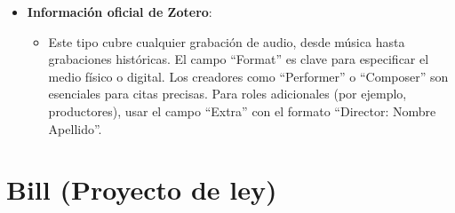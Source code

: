 \documentclass[
  jou,
  floatsintext,
  longtable,
  a4paper,
  nolmodern,
  notxfonts,
  notimes,
  12pt,
  colorlinks=true,linkcolor=blue,citecolor=blue,urlcolor=blue]{apa7}
\providecommand{\tightlist}{%
  \setlength{\itemsep}{0pt}\setlength{\parskip}{0pt}}
\begin{document}
\begin{itemize}
\begin{itemize}
    \textbf{Publisher}: Editorial o productora de la grabación.
  \item
    \textbf{ISBN}: Número ISBN, si la grabación está publicada como
    parte de un conjunto.
  \item
    \textbf{Language}: Código ISO del idioma.
  \item
    \textbf{Short Title}: Título abreviado para citas posteriores.
  \item
    \textbf{URL}: Dirección web de la grabación.
  \item
    \textbf{Accessed}: Fecha de acceso en línea.
  \item
    \textbf{Archive/Loc. in Archive}: Archivo y ubicación específica
    donde se encuentra.
  \item
    \textbf{Library Catalog/Call Number}: Catálogo y número de
    clasificación.
  \item
    \textbf{Rights/Extra/Date Added/Modified}: Igual que en ``Artwork''.
  \end{itemize}
\item
  \textbf{Información oficial de Zotero}:

  \begin{itemize}
  \tightlist
  \item
    Este tipo cubre cualquier grabación de audio, desde música hasta
    grabaciones históricas. El campo ``Format'' es clave para
    especificar el medio físico o digital. Los creadores como
    ``Performer'' o ``Composer'' son esenciales para citas precisas.
    Para roles adicionales (por ejemplo, productores), usar el campo
    ``Extra'' con el formato ``Director: Nombre \textbar\textbar{}
    Apellido''.
  \end{itemize}
\end{itemize}

\section{Bill (Proyecto de ley)}\label{bill-proyecto-de-ley}
\end{document}
